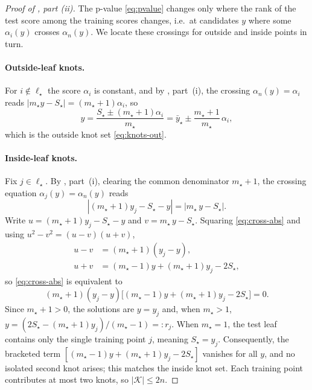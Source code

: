 \documentclass[twoside]{article}
\numberwithin{equation}{section}
\theoremstyle{plain}
\theoremstyle{definition}
\theoremstyle{remark}
\newcommand{\abs}[1]{\left\lvert #1 \right\rvert}
\begin{document}
\begin{proof}[Proof of , part (ii)]
The p-value \eqref{eq:pvalue} changes only where the rank of the test score among the
training scores changes, i.e.\ at candidates $y$ where some $\alpha_i(y)$ crosses
$\alpha_n(y)$. We locate these crossings for outside and inside points in turn.

\paragraph{Outside-leaf knots.}
For $i \notin \ell_\star$ the score $\alpha_i$ is constant, and by
, part~(i), the crossing $\alpha_n(y) = \alpha_i$ reads $\abs{m_\star y - S_\star} = (m_\star+1)\alpha_i$,
so
\begin{equation}\label{eq:cross-out}
  y = \frac{S_\star \pm (m_\star + 1)\alpha_i}{m_\star}
    = \bar{y}_\star \pm \frac{m_\star + 1}{m_\star}\,\alpha_i,
\end{equation}
which is the outside knot set \eqref{eq:knots-out}.

\paragraph{Inside-leaf knots.}
Fix $j \in \ell_\star$. By , part~(i), clearing the common denominator
$m_\star + 1$, the crossing equation $\alpha_j(y) = \alpha_n(y)$ reads
\begin{equation}\label{eq:cross-abs}
  \abs{(m_\star + 1)y_j - S_\star - y}
  = \abs{m_\star\,y - S_\star}.
\end{equation}
Write $u = (m_\star + 1)y_j - S_\star - y$ and $v = m_\star\,y - S_\star$. Squaring
\eqref{eq:cross-abs} and using $u^2 - v^2 = (u-v)(u+v)$,
\begin{align}
  u - v &= (m_\star + 1)(y_j - y), \label{eq:u-minus-v}\\
  u + v &= (m_\star - 1)y + (m_\star + 1)y_j - 2S_\star,
    \label{eq:u-plus-v}
\end{align}
so \eqref{eq:cross-abs} is equivalent to
\begin{equation}\label{eq:cross-factored}
  (m_\star + 1)(y_j - y)
  \bigl[(m_\star - 1)y + (m_\star + 1)y_j - 2S_\star\bigr] = 0.
\end{equation}
Since $m_{\star}+1>0$, the solutions are $y=y_j$ and, when $m_{\star}>1$, $y=(2S_\star-(m_{\star}+1)y_j)/(m_{\star}-1)=:r_j$. When $m_{\star}=1$, the test leaf contains only the single training point $j$, meaning $S_\star=y_j$. Consequently, the bracketed term $[(m_{\star}-1)y+(m_{\star}+1)y_j-2S_\star]$ vanishes for all $y$, and no isolated second knot arises; this matches the inside knot set. Each training point contributes at most two knots,
so $\abs{\mathcal{K}} \le 2n$. 
\end{proof}
\end{document}
